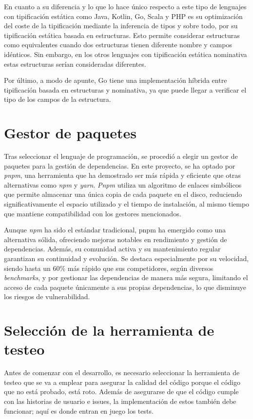 En cuanto a su diferencia y lo que lo hace único respecto a este tipo de lenguajes con tipificación estática como Java, Kotlin, Go, Scala y PHP es su optimización del coste de la tipificación mediante la inferencia de tipos y sobre todo, por su tipificación estática basada en estructuras. Esto permite considerar estructuras como equivalentes cuando dos estructuras tienen diferente nombre y campos idénticos. Sin embargo, en los otros lenguajes con tipificación estática nominativa estas estructuras serían consideradas diferentes.

Por último, a modo de apunte, Go tiene una implementación híbrida entre tipificación basada en estructuras y nominativa, ya que puede llegar a verificar el tipo de los campos de la estructura.

\section{Gestor de paquetes}

Tras seleccionar el lenguaje de programación, se procedió a elegir un gestor de paquetes para la gestión de dependencias. En este proyecto, se ha optado por \textit{pnpm}, una herramienta que ha demostrado ser más rápida y eficiente que otras alternativas como \textit{npm} y \textit{yarn}. \textit{Pnpm} utiliza un algoritmo de enlaces simbólicos que permite almacenar una única copia de cada paquete en el disco, reduciendo significativamente el espacio utilizado y el tiempo de instalación, al mismo tiempo que mantiene compatibilidad con los gestores mencionados.

Aunque \textit{npm} ha sido el estándar tradicional, pnpm ha emergido como una alternativa sólida, ofreciendo mejoras notables en rendimiento y gestión de dependencias. Además, su comunidad activa y su mantenimiento regular garantizan su continuidad y evolución. Se destaca especialmente por su velocidad, siendo hasta un 60\% más rápido que sus competidores, según diversos \textit{benchmarks}, y por gestionar las dependencias de manera más segura, limitando el acceso de cada paquete únicamente a sus propias dependencias, lo que disminuye los riesgos de vulnerabilidad.

\section{Selección de la herramienta de testeo}

Antes de comenzar con el desarrollo, es necesario seleccionar la herramienta de testeo que se va a emplear para asegurar la calidad del código porque el código que no está probado, está roto. Además de asegurarse de que el código cumple con las historias de usuario e issues, la implementación de estos también debe funcionar; aquí es donde entran en juego los tests.

